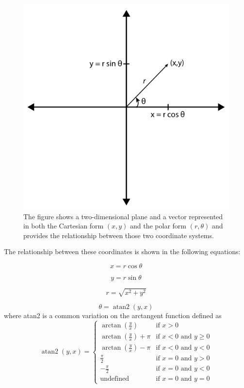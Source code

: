 \begin{figure}
\centering
\includegraphics[width=.55\textwidth]{images/rotation}
\caption{ The figure shows a two-dimensional plane and a vector represented in both the Cartesian form $(x,y)$ and the polar form $(r, \theta)$ and provides the relationship between those two coordinate systems.  }
\label{fig:cordic_polar}
\end{figure}

The relationship between these coordinates is shown in the following equations:

\begin{equation}
x = r \cos \theta
\end{equation}

\begin{equation}
y = r \sin \theta
\end{equation}

\begin{equation}
r =\sqrt{x^2 + y^2}
\end{equation}

\begin{equation}
\theta = \operatorname{atan2}(y, x)
\end{equation}
where atan2 is a common variation on the arctangent function defined as
\begin{equation}
\operatorname{atan2}(y, x) =
\begin{cases}
\arctan(\frac{y}{x}) & \mbox{if } x > 0\\
\arctan(\frac{y}{x}) + \pi & \mbox{if } x < 0 \mbox{ and } y \ge 0\\
\arctan(\frac{y}{x}) - \pi & \mbox{if } x < 0 \mbox{ and } y < 0\\
\frac{\pi}{2} & \mbox{if } x = 0 \mbox{ and } y > 0\\
-\frac{\pi}{2} & \mbox{if } x = 0 \mbox{ and } y < 0\\
\text{undefined} & \mbox{if } x = 0 \mbox{ and } y = 0
\end{cases}
\end{equation}

